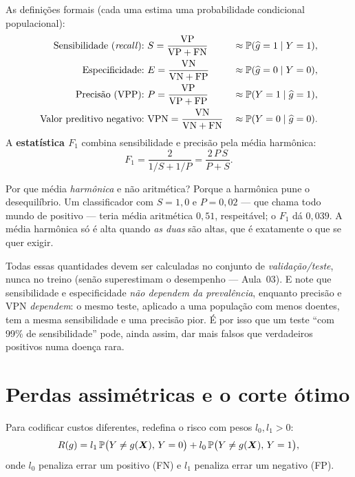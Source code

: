 \documentclass[11pt,a4paper]{article}
\begin{document}
\noindent
As definições formais (cada uma estima uma probabilidade condicional populacional):
\begin{align*}
  \text{Sensibilidade (\emph{recall}):}\ & S=\frac{\text{VP}}{\text{VP}+\text{FN}}
    && \approx \mathbb{P}(\widehat{g}=1\mid Y=1),\\
  \text{Especificidade:}\ & E=\frac{\text{VN}}{\text{VN}+\text{FP}}
    && \approx \mathbb{P}(\widehat{g}=0\mid Y=0),\\
  \text{Precisão (VPP):}\ & P=\frac{\text{VP}}{\text{VP}+\text{FP}}
    && \approx \mathbb{P}(Y=1\mid \widehat{g}=1),\\
  \text{Valor preditivo negativo:}\ & \text{VPN}=\frac{\text{VN}}{\text{VN}+\text{FN}}
    && \approx \mathbb{P}(Y=0\mid \widehat{g}=0).
\end{align*}
A \textbf{estatística $F_1$} combina sensibilidade e precisão pela média harmônica:
\begin{equation}\label{eq:f1}
  F_1 = \frac{2}{1/S + 1/P} = \frac{2\,P\,S}{P+S}.
\end{equation}

\begin{ideia}
Por que média \emph{harmônica} e não aritmética? Porque a harmônica pune o
desequilíbrio. Um classificador com $S=1{,}0$ e $P=0{,}02$ --- que chama todo mundo
de positivo --- teria média aritmética $0{,}51$, respeitável; o $F_1$ dá $0{,}039$.
A média harmônica só é alta quando \emph{as duas} são altas, que é exatamente o que
se quer exigir.
\end{ideia}

\begin{atencao}
Todas essas quantidades devem ser calculadas no conjunto de \emph{validação/teste},
nunca no treino (senão superestimam o desempenho --- Aula~03). E note que
sensibilidade e especificidade \emph{não dependem da prevalência}, enquanto precisão
e VPN \emph{dependem}: o mesmo teste, aplicado a uma população com menos doentes,
tem a mesma sensibilidade e uma precisão pior. É por isso que um teste ``com 99\% de
sensibilidade'' pode, ainda assim, dar mais falsos que verdadeiros positivos numa
doença rara.
\end{atencao}

\section{Perdas assimétricas e o corte ótimo}
Para codificar custos diferentes, redefina o risco com pesos $l_0,l_1>0$:
\begin{equation}\label{eq:riscoassim}
  R(g) = l_1\,\mathbb{P}\big(Y\ne g(\bm{X}),\,Y=0\big)
            + l_0\,\mathbb{P}\big(Y\ne g(\bm{X}),\,Y=1\big),
\end{equation}
onde $l_0$ penaliza errar um positivo (FN) e $l_1$ penaliza errar um negativo (FP).
\end{document}
